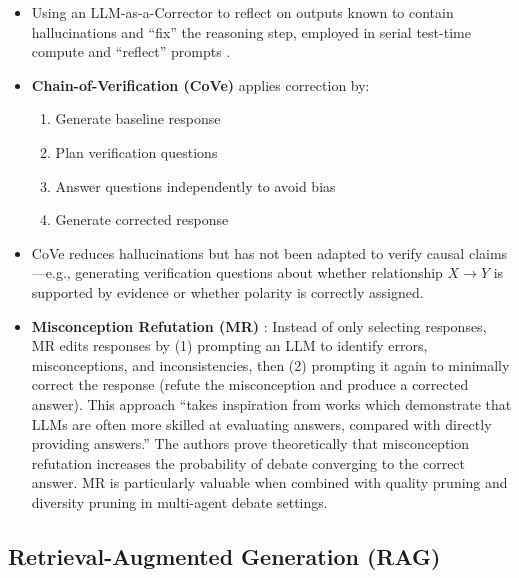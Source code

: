 \documentclass[12pt]{article}
\begin{document}
\begin{itemize}
    \item Using an LLM-as-a-Corrector to reflect on outputs known to contain hallucinations and ``fix'' the reasoning step, employed in serial test-time compute and ``reflect'' prompts \cite{shinn2024reflexion, varshney2023stitch, wei2022chain}.
    \item \textbf{Chain-of-Verification (CoVe)} \cite{dhuliawala-etal-2024-chain} applies correction by:
    \begin{enumerate}
        \item Generate baseline response
        \item Plan verification questions
        \item Answer questions independently to avoid bias
        \item Generate corrected response
    \end{enumerate}
    \item CoVe reduces hallucinations but has not been adapted to verify causal claims---e.g., generating verification questions about whether relationship $X \rightarrow Y$ is supported by evidence or whether polarity is correctly assigned.
    \item \textbf{Misconception Refutation (MR)} \cite{estornell2024multillmdebate}: Instead of only selecting responses, MR edits responses by (1) prompting an LLM to identify errors, misconceptions, and inconsistencies, then (2) prompting it again to minimally correct the response (refute the misconception and produce a corrected answer). This approach ``takes inspiration from works which demonstrate that LLMs are often more skilled at evaluating answers, compared with directly providing answers.'' The authors prove theoretically that misconception refutation increases the probability of debate converging to the correct answer. MR is particularly valuable when combined with quality pruning and diversity pruning in multi-agent debate settings.
\end{itemize}

\subsection{Retrieval-Augmented Generation (RAG)}
\end{document}
